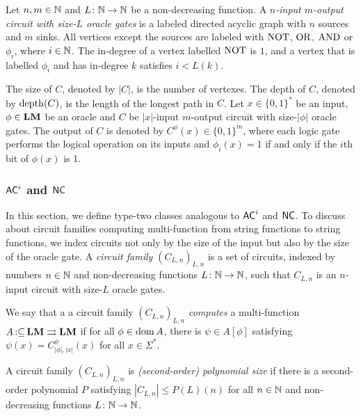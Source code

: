 \documentclass[envcountsame,orivec,oribibl]{llncs}
\newcommand{\pcolon}{\mathpunct{\,:\subseteq}}
\begin{document}
\begin{definition}
Let $n, m \in \mathbb N$ and $L \colon \mathbb N \to \mathbb N$ be a non-decreasing function.
A \emph{$n$-input $m$-output circuit with size-$L$ oracle gates} is 
a labeled directed acyclic graph with $n$ sources and $m$ sinks.
All vertices except the sources are labeled with $\mathrm{NOT}$, $\mathrm{OR}$, $\mathrm{AND}$ 
or $\phi _i$, where $i \in \mathbb N$.
The in-degree of a vertex labelled $\mathrm{NOT}$ is $1$, and
a vertex that is labelled $\phi _i$ and has in-degree $k$ 
satisfies $i < L(k)$.

The size of $C$, denoted by $|C|$, is the number of vertexes.
The depth of $C$, denoted by $\mathop{\rm depth}(C)$, is the length of the longest path in $C$.
Let $x \in \{0, 1\}^*$ be an input, $\phi \in \mathbf{LM}$ be an oracle and
$C$ be $|x|$-input $m$-output circuit with size-$|\phi|$ oracle gates.
The output of $C$ is denoted by $C^\phi(x) \in \{0, 1\}^m$,
where each logic gate performs the logical operation on its inputs
and $\phi_i(x) = 1$ if and only if the $i$th bit of $\phi(x)$ is 1.
\end{definition}


\subsubsection{$\mathsf{AC}^i$ and $\mathsf{NC}$}

In this section, we define type-two classes analogous to 
$\mathsf{AC}^i$ and $\mathsf{NC}$.
To discuss about circuit families computing multi-function from string functions to string functions,
we index circuits not only by the size of the input but also by the size of the oracle gate.
A {\em circuit family $(C_{L,n})_{L,n}$} is a set of circuits, 
indexed by numbers $n \in \mathbb N$ and non-decreasing functions $L \colon \mathbb N \to \mathbb N$,
such that $C_{L, n}$ is an $n$-input circuit with size-$L$ oracle gates.


\begin{definition}
 We say that a a circuit family $(C_{L,n})_{L,n}$ 
\emph{computes} a multi-function 
 $A \pcolon \LM \rightrightarrows \LM$ if for all $\phi \in \mathop{\rm dom} A$, 
 there is $\psi \in A[\phi]$ satisfying $\psi(x) = C_{|\phi|, |x|}^\phi(x)$
 for all $x \in \Sigma^*$.
\end{definition}

A circuit family $(C_{L,n})_{L,n}$ is \emph{(second-order) polynomial size}
if there is a second-order polynomial $P$ satisfying
$|C_{L,n}| \le P(L)(n)$ for all $n \in \mathbb N$ and non-decreasing functions
$L \colon \mathbb N \to \mathbb N$.
\end{document}
